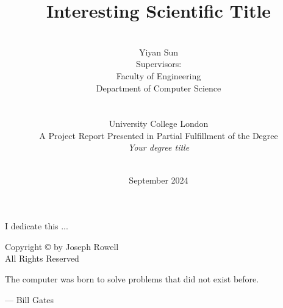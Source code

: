 \documentclass[12pt, a4paper]{report}
\date{September 2024}
\title{Interesting Scientific Title}
\author{\\ \Large{Yiyan Sun}
\\ Supervisors: 
\\ Faculty of Engineering
\\ Department of Computer Science
\\ 
\\
\\ University College London
\\
A Project Report Presented in Partial Fulfillment of the Degree \\ \textit{Your degree title}
\\ \\
}
\begin{document}
      

\thispagestyle{headings}
\maketitle
\FloatBarrier
{}

\thispagestyle{empty}
\begin{abstract}


\end{abstract}
\newpage
\thispagestyle{empty}
\begin{center}
I dedicate this ...
\end{center}

\newpage
\thispagestyle{empty}
\vspace*{\fill}
\begin{center}
Copyright \copyright  {} by Joseph Rowell \\ All Rights Reserved
\end{center}
\vspace*{\fill}
\newpage
\thispagestyle{empty}
\epigraph{The computer was born to solve problems that did not exist before.}{--- \textup{Bill Gates}}
\end{document}
